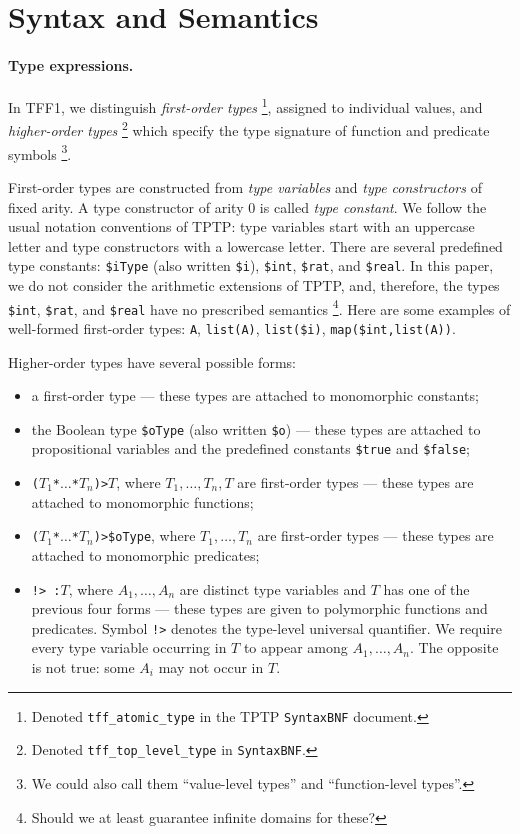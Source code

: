 \section{Syntax and Semantics} \label{sec_logic}

\paragraph{Type expressions.} In TFF1, we distinguish
{\em first-order types}%
\footnote{Denoted {\tt tff\_atomic\_type} in the
TPTP {\tt SyntaxBNF} document.}, assigned to individual values,
and {\em higher-order types}%
\footnote{Denoted {\tt tff\_top\_level\_type} in {\tt SyntaxBNF}.}
which specify the type signature of function and predicate symbols%
\footnote{We could also call them ``value-level types'' and
``function-level types''.}.

First-order types are constructed from {\em type variables\/}
and {\em type constructors\/} of fixed arity. A type constructor
of arity 0 is called {\em type constant}. We follow the usual
notation conventions of TPTP: type variables start with an
uppercase letter and type constructors with a lowercase letter.
There are several predefined type constants:
\verb+$iType+ (also written \verb+$i+),
\verb+$int+, \verb+$rat+, and \verb+$real+. In this paper,
we do not consider the arithmetic extensions of TPTP, and,
therefore, the types \verb+$int+, \verb+$rat+, and \verb+$real+
have no prescribed semantics%
\footnote{Should we at least guarantee infinite domains for these?}.
Here are some examples of well-formed first-order types:
\verb+A+, \verb+list(A)+, \verb+list($i)+, \verb+map($int,list(A))+.

Higher-order types have several possible forms:
\begin{itemize}
\item a first-order type --- these types are attached to
monomorphic constants;
\item the Boolean type \verb+$oType+ (also written \verb+$o+)
--- these types are attached to propositional variables and
the predefined constants \verb+$true+ and \verb+$false+;
\item {\tt ($T_1$\;*\;$\dots$\;*\;$T_n$)\;>\;$T$},
where $T_1,\dots,T_n,T$ are first-order types ---
these types are attached to monomorphic functions;
\item {\tt ($T_1$\;*\;$\dots$\;*\;$T_n$)\;>\;\$oType},
where $T_1,\dots,T_n$ are first-order types --- these types
are attached to monomorphic predicates;
\item {\tt !>\,:\;$T$}, where $A_1,\dots,A_n$ are distinct
type variables and $T$ has one of the previous four forms ---
these types are given to polymorphic functions and predicates.
Symbol {\tt !>} denotes the type-level universal quantifier.
We require every type variable occurring in $T$ to appear
among $A_1,\dots,A_n$. The opposite is not true:
some $A_i$ may not occur in $T$.
\end{itemize}

